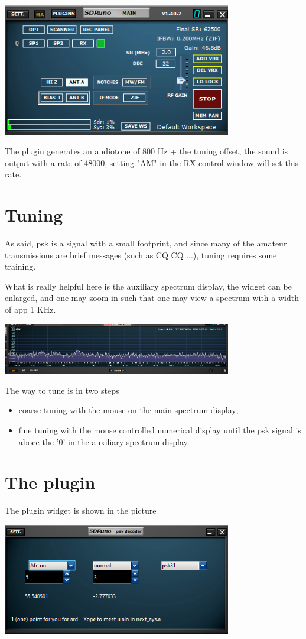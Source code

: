 \documentclass[11pt]{article}
\begin{document}
\includegraphics[width=100mm]{main-widget.png}

The plugin generates an audiotone of 800 Hz + the tuning offset,
the sound is output with a rate of 48000, setting "AM" in the RX control window
will set this rate.

\section{Tuning}
As said, psk is a signal with a small footprint, and since many of
the amateur transmissions are brief messages (such as CQ CQ ...), tuning
requires some training.
\par
What is really helpful here is the auxiliary spectrum display, the widget
can be enlarged, and one may zoom in such that one may view a spectrum
with a width of app 1 KHz.

\includegraphics[width=100mm]{auxiliary-spectrum-display.png}

The way to tune is in two steps
\begin{itemize}
\item coarse tuning with the mouse on the main spectrum display;
\item fine tuning with the mouse controlled numerical display until the
psk signal is aboce the '0' in the auxiliary spectrum display.
\end{itemize}

\section{The plugin}
The plugin widget  is shown in the picture

\includegraphics[width=100mm]{psk-plugin-widget.png}
\end{document}
